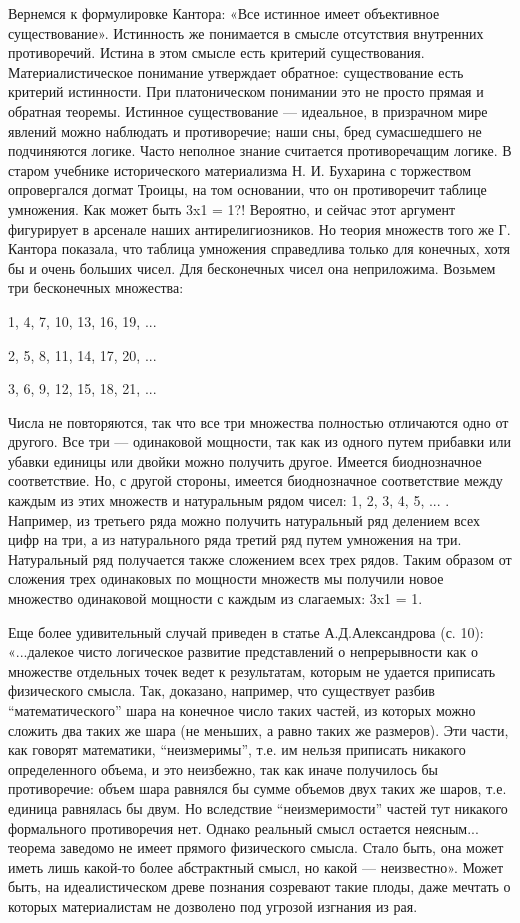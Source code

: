 Вернемся  к  формулировке  Кантора: «Все  истинное  имеет  объективное
существование».   Истинность  же   понимается   в  смысле   отсутствия
внутренних   противоречий.  Истина   в  этом   смысле  есть   критерий
существования.   Материалистическое  понимание   утверждает  обратное:
существование  есть критерий  истинности. При  платоническом понимании
это  не  просто  прямая  и обратная  теоремы.  Истинное  существование
---   идеальное,  в   призрачном  мире   явлений  можно   наблюдать  и
противоречие; наши сны, бред сумасшедшего не подчиняются логике. Часто
неполное  знание считается  противоречащим логике.  В старом  учебнике
исторического материализма  Н. И.  Бухарина с  торжеством опровергался
догмат  Троицы,   на  том  основании,  что   он  противоречит  таблице
умножения. Как может  быть 3x1 = 1?! Вероятно, и  сейчас этот аргумент
фигурирует в арсенале наших антирелигиозников. Но теория множеств того
же Г. Кантора  показала, что таблица умножения  справедлива только для
конечных, хотя  бы и  очень больших чисел.  Для бесконечных  чисел она
неприложима. Возьмем три бесконечных множества:

1, 4, 7, 10, 13, 16, 19, ...

2, 5, 8, 11, 14, 17, 20, ...

3, 6, 9, 12, 15, 18, 21, ...

Числа не повторяются,  так что все три  множества полностью отличаются
одно от  другого. Все три ---  одинаковой мощности, так как  из одного
путем прибавки  или убавки единицы  или двойки можно  получить другое.
Имеется  биоднозначное соответствие.  Но,  с  другой стороны,  имеется
биоднозначное соответствие между каждым из этих множеств и натуральным
рядом чисел:  1, 2, 3,  4, 5, ... .  Например, из третьего  ряда можно
получить натуральный ряд делением всех  цифр на три, а из натурального
ряда третий  ряд путем  умножения на  три. Натуральный  ряд получается
также  сложением  всех трех  рядов.  Таким  образом от  сложения  трех
одинаковых по мощности множеств мы получили новое множество одинаковой
мощности с каждым из слагаемых: 3x1 = 1.

Еще  более  удивительный  случай приведен  в  статье  А.Д.Александрова
(с.  10):  «...далекое  чисто   логическое  развитие  представлений  о
непрерывности  как о  множестве отдельных  точек ведет  к результатам,
которым  не  удается  приписать  физического  смысла.  Так,  доказано,
например, что  существует разбив ``математического'' шара  на конечное
число  таких  частей, из  которых  можно  сложить  два таких  же  шара
(не  меньших, а  равно  таких  же размеров).  Эти  части, как  говорят
математики,   ``неизмеримы'',  т.е.   им  нельзя   приписать  никакого
определенного  объема,  и  это  неизбежно, так  как  иначе  получилось
бы   противоречие:  объем   шара  равнялся   бы  сумме   объемов  двух
таких  же  шаров,  т.е.  единица  равнялась  бы  двум.  Но  вследствие
``неизмеримости''  частей тут  никакого формального  противоречия нет.
Однако реальный  смысл остается  неясным... теорема заведомо  не имеет
прямого физического смысла. Стало быть,  она может иметь лишь какой-то
более  абстрактный смысл,  но какой  --- неизвестно».  Может быть,  на
идеалистическом древе  познания созревают такие плоды,  даже мечтать о
которых материалистам не дозволено под угрозой изгнания из рая.

